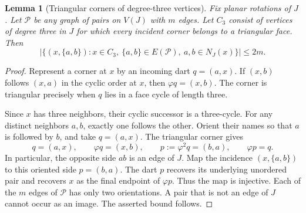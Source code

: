 \documentclass[11pt,a4paper]{article}
\newtheorem{lemma}[lemma]{Lemma}
\theoremstyle{definition}
\theoremstyle{remark}
\begin{document}
\begin{lemma}[Triangular corners of degree-three vertices]
\label{geom:triangle-injection}
Fix planar rotations of $J$. Let $\mathcal P$ be any graph of pairs on
$V(J)$ with $m$ edges. Let $C_3$ consist of vertices of degree three in
$J$ for which every incident corner belongs to a triangular face. Then
\[
 |\{(x,\{a,b\}):x\in C_3,\ \{a,b\}\in E(\mathcal P),
                         \ a,b\in N_J(x)\}|\leq2m.
\]
\end{lemma}
\begin{proof}
Represent a corner at $x$ by an incoming dart $q=(a,x)$. If $(x,b)$
follows $(x,a)$ in the cyclic order at $x$, then $\varphi q=(x,b)$.
The corner is triangular precisely when $q$ lies in a face cycle of
length three.

Since $x$ has three neighbors, their cyclic successor is a three-cycle.
For any distinct neighbors $a,b$, exactly one follows the other.
Orient their names so that $a$ is followed by $b$, and take $q=(a,x)$.
The triangular corner gives
\[
 q=(a,x),\qquad \varphi q=(x,b),\qquad
 p:=\varphi^2q=(b,a),\qquad \varphi p=q.
\]
In particular, the opposite side $ab$ is an edge of $J$.
Map the incidence $(x,\{a,b\})$ to this oriented side $p=(b,a)$.
The dart $p$ recovers its underlying unordered pair and recovers $x$ as
the final endpoint of $\varphi p$. Thus the map is injective. Each of
the $m$ edges of $\mathcal P$ has only two orientations. A pair that is
not an edge of $J$ cannot occur as an image. The asserted bound follows.
\end{proof}
\end{document}
